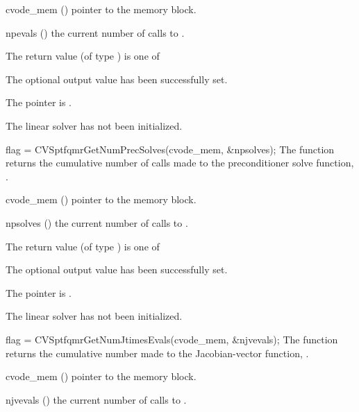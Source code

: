 {
  \begin{args}
  \item[cvode\_mem] ()
    pointer to the {\cvodes} memory block.
  \item[npevals] ()
    the current number of calls to .
  \end{args}
}
{
  The return value  (of type ) is one of
  \begin{args}
  \item[\Id{CVSPTFQMR\_SUCCESS}] 
    The optional output value has been successfully set.
  \item[\Id{CVSPTFQMR\_MEM\_NULL}]
    The  pointer is .
  \item[\Id{CVSPTFQMR\_LMEM\_NULL}]
    The {\cvsptfqmr} linear solver has not been initialized.
  \end{args}
}
{}
{
  flag = CVSptfqmrGetNumPrecSolves(cvode\_mem, \&npsolves);
}
{
  The function  returns the
  cumulative number of calls made to the preconditioner 
  solve function, .
}
{
  \begin{args}
  \item[cvode\_mem] ()
    pointer to the {\cvodes} memory block.
  \item[npsolves] ()
    the current number of calls to .
  \end{args}
}
{
  The return value  (of type ) is one of
  \begin{args}
  \item[\Id{CVSPTFQMR\_SUCCESS}] 
    The optional output value has been successfully set.
  \item[\Id{CVSPTFQMR\_MEM\_NULL}]
    The  pointer is .
  \item[\Id{CVSPTFQMR\_LMEM\_NULL}]
    The {\cvsptfqmr} linear solver has not been initialized.
  \end{args}
}
{}
{
  flag = CVSptfqmrGetNumJtimesEvals(cvode\_mem, \&njvevals);
}
{
  The function  returns the
  cumulative number made to the Jacobian-vector function,
  .
}
{
  \begin{args}
  \item[cvode\_mem] ()
    pointer to the {\cvodes} memory block.
  \item[njvevals] ()
    the current number of calls to .
  \end{args}
}
